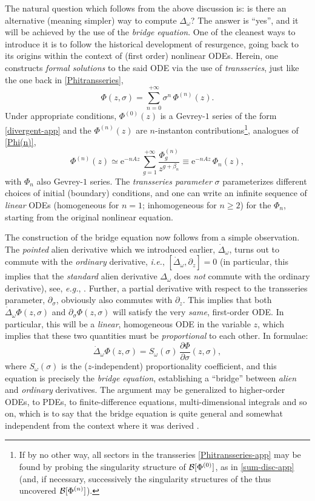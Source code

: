 \documentclass[11pt,a4paper]{article}
\newcommand{\CB}{{\cal B}}
\newcommand{\be}{\begin{equation}}
\newcommand{\ee}{\end{equation}}
\newcommand{\rme}{{\mathrm{e}}}
\begin{document}
The natural question which follows from the above discussion is: is there an alternative (meaning simpler) way to compute $\Delta_\omega$? The answer is ``yes'', and it will be achieved by the use of the \textit{bridge equation}. One of the cleanest ways to introduce it is to follow the historical development of resurgence, going back to its origins within the context of (first order) nonlinear ODEs. Herein, one constructs \textit{formal solutions} to the said ODE via the use of \textit{transseries}, just like the one back in \eqref{Phitransseries},
%
\be
\label{Phitransseries-app}
\Phi (z,\sigma) = \sum_{n=0}^{+\infty} \sigma^n\, \Phi^{(n)} (z).
\ee
%
\noindent
Under appropriate conditions, $\Phi^{(0)} (z)$ is a Gevrey-$1$ series of the form \eqref{divergent-app} and the $\Phi^{(n)} (z)$ are $n$-instanton contributions\footnote{If by no other way, all sectors in the transseries \eqref{Phitransseries-app} may be found by probing the singularity structure of $\CB[\Phi^{(0)}]$, as in \eqref{sum-disc-app} (and, if necessary, successively the singularity structures of the thus uncovered $\CB[\Phi^{(n)}]$).}, analogues of \eqref{Phi(n)},
%
\be
\label{Phi(n)-app}
\Phi^{(n)} (z) \simeq \rme^{-n A z}\, \sum_{g=1}^{+\infty} \frac{\Phi_g^{(n)}}{z^{g + \beta_n}} \equiv \rme^{-n A z}\, \Phi_n (z),
\ee
%
\noindent
with $\Phi_n$ also Gevrey-$1$ series. The \textit{transseries parameter} $\sigma$ parameterizes different choices of initial (boundary) conditions, and one can write an infinite sequence of \textit{linear} ODEs (homogeneous for $n=1$; inhomogeneous for $n\ge2$) for the $\Phi_n$, starting from the original nonlinear equation.

The construction of the bridge equation now follows from a simple observation. The \textit{pointed} alien derivative which we introduced earlier, $\dot{\Delta}_\omega$, turns out to commute with the \textit{ordinary} derivative, \textit{i.e.}, $[ \dot{\Delta}_\omega, \partial_z ] = 0$ (in particular, this implies that the \textit{standard} alien derivative $\Delta_\omega$ does \textit{not} commute with the ordinary derivative), see, \textit{e.g.}, \cite{e81, s07, s14}. Further, a partial derivative with respect to the transseries parameter, $\partial_\sigma$, obviously also commutes with $\partial_z$. This implies that both $\dot{\Delta}_\omega \Phi (z,\sigma)$ and $\partial_\sigma \Phi (z,\sigma)$ will satisfy the very \textit{same}, first-order ODE. In particular, this will be a \textit{linear}, homogeneous ODE in the variable $z$, which implies that these two quantities must be \textit{proportional} to each other. In formulae:
%
\be
\label{bridge-equation-app}
\dot{\Delta}_\omega \Phi (z,\sigma) = S_\omega(\sigma)\, \frac{\partial\Phi}{\partial\sigma} (z,\sigma),
\ee
%
\noindent
where $S_\omega(\sigma)$ is the ($z$-independent) proportionality coefficient, and this equation is precisely the \textit{bridge equation}, establishing a ``bridge'' between \textit{alien} and \textit{ordinary} derivatives. The argument may be generalized to higher-order ODEs, to PDEs, to finite-difference equations, multi-dimensional integrals and so on, which is to say that the bridge equation is quite general and somewhat independent from the context where it was derived \cite{e81, s07, s14}.
\end{document}
